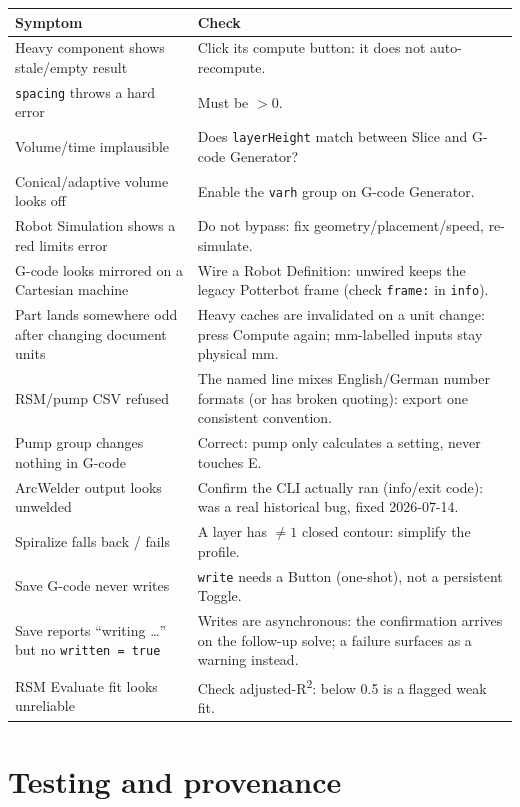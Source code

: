 \documentclass[11pt]{article}
\newcommand{\param}[1]{\texttt{#1}}
\begin{document}
\begin{longtable}{@{}p{4.6cm}p{7.8cm}@{}}
\toprule
\textbf{Symptom} & \textbf{Check} \\
\midrule
\endhead
Heavy component shows stale/empty result & Click its compute button: it does not auto-recompute. \\
\param{spacing} throws a hard error & Must be $> 0$. \\
Volume/time implausible & Does \param{layerHeight} match between Slice and G-code Generator? \\
Conical/adaptive volume looks off & Enable the \param{varh} group on G-code Generator. \\
Robot Simulation shows a red limits error & Do not bypass: fix geometry/placement/speed, re-simulate. \\
G-code looks mirrored on a Cartesian machine & Wire a Robot Definition: unwired keeps the legacy Potterbot frame (check \texttt{frame:} in \param{info}). \\
Part lands somewhere odd after changing document units & Heavy caches are invalidated on a unit change: press Compute again; mm-labelled inputs stay physical mm. \\
RSM/pump CSV refused & The named line mixes English/German number formats (or has broken quoting): export one consistent convention. \\
Pump group changes nothing in G-code & Correct: pump only calculates a setting, never touches E. \\
ArcWelder output looks unwelded & Confirm the CLI actually ran (info/exit code): was a real historical bug, fixed 2026-07-14. \\
Spiralize falls back / fails & A layer has $\neq 1$ closed contour: simplify the profile. \\
Save G-code never writes & \param{write} needs a Button (one-shot), not a persistent Toggle. \\
Save reports ``writing \ldots'' but no \param{written = true} & Writes are asynchronous: the confirmation arrives on the follow-up solve; a failure surfaces as a warning instead. \\
RSM Evaluate fit looks unreliable & Check adjusted-R\textsuperscript{2}: below 0.5 is a flagged weak fit. \\
\bottomrule
\end{longtable}

\section{Testing and provenance}
\end{document}
